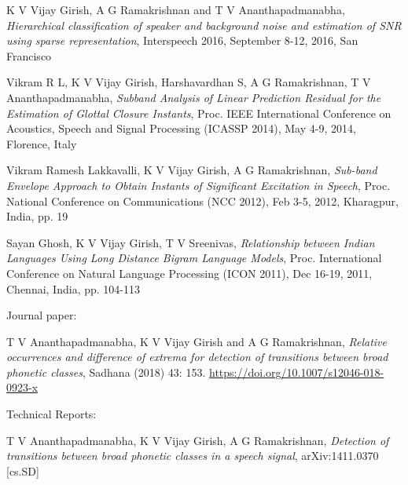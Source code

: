 \documentclass[line]{resume}
\begin{document}
{\begin{resume}
\begin{list2}
				\item	K V Vijay Girish, A G Ramakrishnan and T V Ananthapadmanabha, \textit{Hierarchical classification of speaker and background noise and estimation of SNR using sparse representation}, Interspeech 2016, September 8-12, 2016, San Francisco
				
				
				
				\item Vikram R L, K V Vijay Girish, Harshavardhan S, A G Ramakrishnan, T V Ananthapadmanabha, 
				\textit{Subband Analysis of Linear Prediction Residual for the Estimation of Glottal Closure Instants}, Proc. IEEE International Conference on Acoustics, Speech and Signal Processing (ICASSP 2014), May 4-9, 2014, Florence, Italy
				
				
				\item
				Vikram Ramesh Lakkavalli, K V Vijay Girish, A G Ramakrishnan, \textit{Sub-band Envelope Approach to Obtain Instants of Significant Excitation in Speech}, Proc. National Conference on Communications (NCC 2012), Feb 3-5, 2012, Kharagpur, India, pp. 19
				
				
				\item Sayan Ghosh, K V Vijay Girish, T V Sreenivas, \textit{Relationship between Indian Languages Using Long Distance Bigram Language Models}, Proc. International Conference on Natural Language Processing (ICON
			2011), Dec 16-19, 2011, Chennai, India, pp. 104-113
			
			
			\end{list2}
			\vspace{-1mm}
			Journal paper:
			\begin{list2}
			\item T V Ananthapadmanabha, K V Vijay Girish and A G Ramakrishnan,  \textit{Relative occurrences and difference of extrema for detection of transitions between broad phonetic classes},  Sadhana
			 (2018) 43: 153. \url{https://doi.org/10.1007/s12046-018-0923-x}
			\end{list2}
		
			\vspace{-1mm}
		Technical Reports:
		\begin{list2}
		\item T V Ananthapadmanabha, K V Vijay Girish, A G Ramakrishnan, \textit{Detection of transitions between broad phonetic classes in a speech signal}, 	arXiv:1411.0370 [cs.SD]
		

\end{list2}
\end{resume}}
\end{document}
